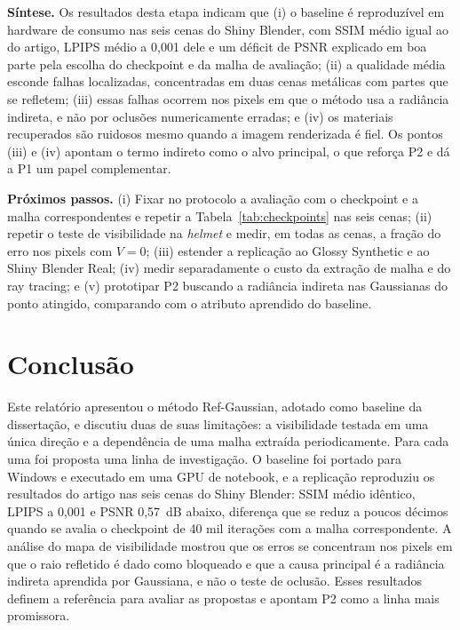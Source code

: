 \documentclass[conference]{IEEEtran}
\begin{document}
\textbf{Síntese.} Os resultados desta etapa indicam que (i) o baseline é reproduzível em hardware de consumo nas seis cenas do Shiny Blender, com SSIM médio igual ao do artigo, LPIPS médio a 0,001 dele e um déficit de PSNR explicado em boa parte pela escolha do checkpoint e da malha de avaliação; (ii) a qualidade média esconde falhas localizadas, concentradas em duas cenas metálicas com partes que se refletem; (iii) essas falhas ocorrem nos pixels em que o método usa a radiância indireta, e não por oclusões numericamente erradas; e (iv) os materiais recuperados são ruidosos mesmo quando a imagem renderizada é fiel. Os pontos (iii) e (iv) apontam o termo indireto como o alvo principal, o que reforça P2 e dá a P1 um papel complementar.

\textbf{Próximos passos.} (i) Fixar no protocolo a avaliação com o checkpoint e a malha correspondentes e repetir a Tabela~\ref{tab:checkpoints} nas seis cenas; (ii) repetir o teste de visibilidade na \textit{helmet} e medir, em todas as cenas, a fração do erro nos pixels com $V=0$; (iii) estender a replicação ao Glossy Synthetic e ao Shiny Blender Real; (iv) medir separadamente o custo da extração de malha e do ray tracing; e (v) prototipar P2 buscando a radiância indireta nas Gaussianas do ponto atingido, comparando com o atributo aprendido do baseline.

\section{Conclusão}

Este relatório apresentou o método Ref-Gaussian, adotado como baseline da dissertação, e discutiu duas de suas limitações: a visibilidade testada em uma única direção e a dependência de uma malha extraída periodicamente. Para cada uma foi proposta uma linha de investigação. O baseline foi portado para Windows e executado em uma GPU de notebook, e a replicação reproduziu os resultados do artigo nas seis cenas do Shiny Blender: SSIM médio idêntico, LPIPS a 0,001 e PSNR 0,57~dB abaixo, diferença que se reduz a poucos décimos quando se avalia o checkpoint de 40 mil iterações com a malha correspondente. A análise do mapa de visibilidade mostrou que os erros se concentram nos pixels em que o raio refletido é dado como bloqueado e que a causa principal é a radiância indireta aprendida por Gaussiana, e não o teste de oclusão. Esses resultados definem a referência para avaliar as propostas e apontam P2 como a linha mais promissora.
\end{document}
